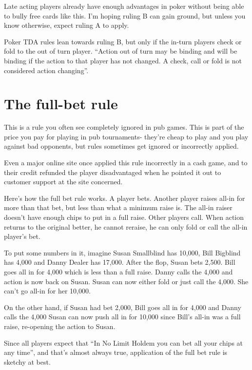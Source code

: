 Late acting players already have enough advantages in poker without 
being able to bully free cards like this. I'm hoping ruling B can 
gain ground, but unless you know otherwise, expect ruling A to apply.

Poker TDA rules lean towards ruling B, but only if the in-turn players
check or fold to the out of turn player. ``Action out of turn may be binding
and will be binding if the action to that player has not changed. A
check, call or fold is not considered action changing''.


\section{The full-bet rule}

This is a rule you often see completely ignored in pub games. 
This is part of the price you pay for playing
in pub tournaments- they're cheap to play and you play against
bad opponents, but rules sometimes get ignored or incorrectly applied.

Even a major online site once applied this rule incorrectly in
a cash game, and to their credit refunded the player disadvantaged
when he pointed it out to customer support at the site concerned.

Here's how the full bet rule works. A player bets. Another player 
raises all-in for more than that bet, but less than what a minimum raise is. 
The all-in raiser doesn't have enough chips to put in a full raise. 
Other players call. When action returns to the original better, he 
cannot reraise, he can only fold or call the all-in player's bet.

To put some numbers in it, imagine Susan Smallblind has 10,000,
Bill Bigblind has 4,000 and Danny Dealer has 17,000. After the flop, 
Susan bets 2,500. Bill goes all in for 4,000 which is less 
than a full raise. Danny calls the 4,000 and action is now back on Susan.
Susan can now either fold or just call the 4,000. She can't go all-in 
for her 10,000.

On the other hand, if Susan had bet 2,000, Bill goes all in for 4,000
and Danny calls the 4,000 Susan can now push all in for 10,000 since
Bill's all-in was a full raise, re-opening the action to Susan.

Since all players expect that ``In No Limit Holdem you
can bet all your chips at any time'', and that's almost always true,
application of the full bet rule is sketchy at best.

